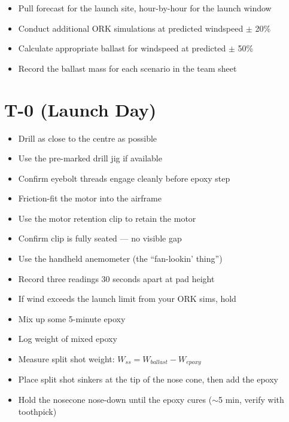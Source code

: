 \documentclass[11pt,a4paper,oneside]{report}
\begin{document}
\begin{itemize}
  \item Pull forecast for the launch site, hour-by-hour for the launch window
  \item Conduct additional ORK simulations at predicted windspeed $\pm$ 20\%
  \item Calculate appropriate ballast for windspeed at predicted $\pm$ 50\%
  \item Record the ballast mass for each scenario in the team sheet
\end{itemize}

\section{T-0 (Launch Day)}

\begin{itemize}
  \item Drill as close to the centre as possible
  \item Use the pre-marked drill jig if available
  \item Confirm eyebolt threads engage cleanly before epoxy step
\end{itemize}

\begin{itemize}
  \item Friction-fit the motor into the airframe
  \item Use the motor retention clip to retain the motor
  \item Confirm clip is fully seated --- no visible gap
\end{itemize}

\begin{itemize}
  \item Use the handheld anemometer (the ``fan-lookin' thing'')
  \item Record three readings 30 seconds apart at pad height
  \item If wind exceeds the launch limit from your ORK sims, hold
\end{itemize}

\begin{itemize}
  \item Mix up some 5-minute epoxy
  \item Log weight of mixed epoxy
  \item Measure split shot weight: $W_{ss} = W_{ballast} - W_{epoxy}$
  \item Place split shot sinkers at the tip of the nose cone, then add the epoxy
  \item Hold the nosecone nose-down until the epoxy cures ($\sim$5 min, verify with toothpick)
\end{itemize}
\end{document}
